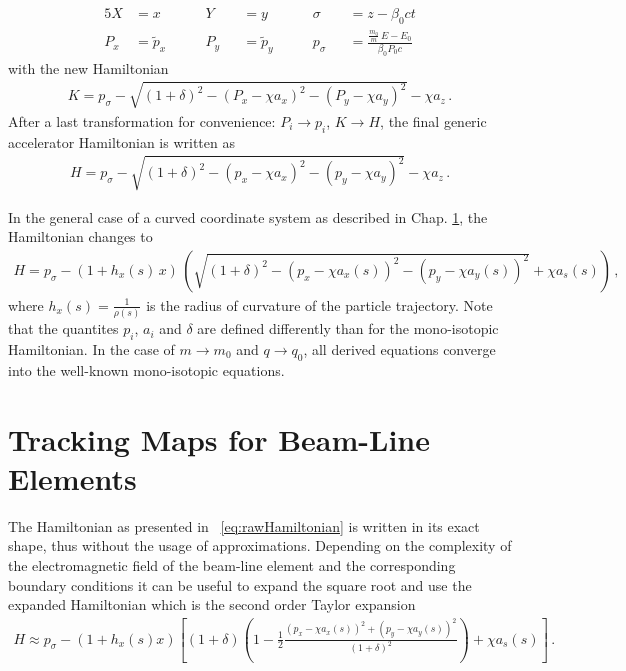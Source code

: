 %
\begin{alignat}{5}
X  &= x            \quad \quad  &Y   &&= y            \quad \quad &\sigma   &&= z - \beta_0 ct  \\ \label{eq:sigmadefinition}
P_x&= \tilde{p}_x  \quad \quad  &P_y &&= \tilde{p}_y  \quad \quad &p_\sigma &&= \frac{\frac{m_0}{m} \, E - E_0}{\beta_0 P_0 c} 
\end{alignat}
%
with the new Hamiltonian 
\begin{align}
K = p_\sigma - \sqrt{(1+\delta)^2 - (P_x - \chi a_x)^2 - (P_y-\chi a_y)^2} - \chi a_z \, .
\end{align}
After a last transformation for convenience: $P_i \rightarrow p_i$, $K \rightarrow H$, the final generic accelerator Hamiltonian is written as
\begin{align}
H = p_\sigma - \sqrt{(1+\delta)^2 - (p_x - \chi a_x)^2 - (p_y-\chi a_y)^2} - \chi a_z \, .
\end{align}


%
In the general case of a curved coordinate system as described in Chap. \ref{}, the Hamiltonian changes to~\cite{}
%
\begin{align}
H = p_\sigma - (1+h_x(s)\,x) \, \left(  \sqrt{ (1+\delta)^2  - (p_x - \chi a_x(s))^2 - (p_y-\chi a_y(s))^2} + \chi a_s(s)  \right) \, , \label{eq:rawHamiltonian}
\end{align}
%
where $h_x(s) = \frac{1}{\rho(s)}$ is the radius of curvature of the particle trajectory. Note that the quantites $p_i$, $a_i$ and $\delta$ are defined differently than for the mono-isotopic Hamiltonian. In the case of $m \rightarrow m_0$ and $q \rightarrow q_0$, all derived equations converge into the well-known mono-isotopic equations.



\section{Tracking Maps for Beam-Line Elements}
The Hamiltonian as presented in ~\eqref{eq:rawHamiltonian} is written in its exact shape, thus without the usage of approximations. Depending on the complexity of the electromagnetic field of the beam-line element and the corresponding boundary conditions it can be useful to expand the square root and use the expanded Hamiltonian which is the second order Taylor expansion
\begin{align}
H \approx p_\sigma - (1+h_x(s)x) \left[ (1+\delta) \left( 1 - \frac{1}{2} \frac{(p_x - \chi a_x(s))^2 + (p_y - \chi a_y(s))^2 }{(1+\delta)^2} \right) + \chi a_s(s) \right] \, . \label{eq:expanded_hamiltonian}
\end{align}  

